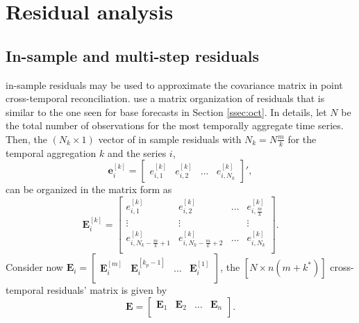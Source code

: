 \documentclass[a4paper,11pt]{article}
\newcommand{\evet}{\bm{e}}
\newcommand{\Evet}{\bm{E}}
\theoremstyle{definition}
\begin{document}
\section{Residual analysis}\label{sec:res}

\subsection{In-sample and multi-step residuals} \label{ssec:multi_res}
in-sample residuals may be used to approximate the covariance matrix in point cross-temporal reconciliation. \cite{difonzo2023} use a matrix organization of residuals that is similar to the one seen for base forecasts in Section \ref{ssec:oct}. In details, let $N$ be the total number of observations for the most temporally aggregate time series. Then, the $(N_k\times 1)$ vector of in sample residuals with $N_k = N\frac{m}{k}$ for the temporal aggregation $k$ and the series $i$,
$$
\evet_i^{[k]} = \begin{bmatrix}
	e_{i,1}^{[k]} & e_{i,2}^{[k]} & \dots & e_{i,N_k}^{[k]}
\end{bmatrix}',
$$
can be organized in the matrix form as
\begin{equation}\label{eq:Evetki}
	\Evet_i^{[k]} = \begin{bmatrix}
	e_{i,1}^{[k]} & e_{i,2}^{[k]} & \dots & e_{i,\frac{m}{k}}^{[k]} \\
	\vdots & \vdots & & \vdots \\
	e_{i,N_k - \frac{m}{k} + 1}^{[k]} & e_{i,N_k - \frac{m}{k} + 2}^{[k]} & \dots & e_{i,N_k}^{[k]} \\
\end{bmatrix}.
\end{equation}
Consider now $\Evet_i = \begin{bmatrix}
	\Evet_i^{[m]} & \Evet_i^{[k_p-1]} & \dots & \Evet_i^{[1]}\\
\end{bmatrix}$, the $[N \times n(m+k^\ast)]$ cross-temporal residuals' matrix is given by
\begin{equation}
\label{eq:Emat}
\Evet = \begin{bmatrix}
	\Evet_1 & \Evet_2 & \dots & \Evet_n\\
\end{bmatrix}.
\end{equation}
\end{document}
